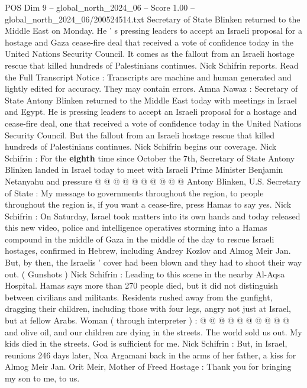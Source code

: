 \begin{textsample}{POS Dim 9 – global\_north\_2024\_06 – Score 1.00 – global\_north\_2024\_06/200524514.txt}  \label{ex:f9_pos_286}
Secretary of State Blinken returned to the Middle East on Monday.
He ' s pressing leaders to accept an Israeli proposal for a hostage and Gaza cease-fire deal that received a vote of confidence today in the United Nations Security Council.
It comes as the fallout from an Israeli hostage rescue that killed hundreds of Palestinians continues.
Nick Schifrin reports.
Read the Full Transcript Notice : Transcripts are machine and human generated and lightly edited for accuracy.
They may contain errors.
Amna Nawaz : Secretary of State Antony Blinken returned to the Middle East today with meetings in Israel and Egypt.
He is pressing leaders to accept an Israeli proposal for a hostage and cease-fire deal, one that received a vote of confidence today in the United Nations Security Council.
But the fallout from an Israeli hostage rescue that killed hundreds of Palestinians continues.
Nick Schifrin begins our coverage.
Nick Schifrin : For the \textbf{eighth} time since October the 7th, Secretary of State Antony Blinken landed in Israel today to meet with Israeli Prime Minister Benjamin Netanyahu and pressure @ @ @ @ @ @ @ @ @ @ Antony Blinken, U.S.
Secretary of State : My message to governments throughout the region, to people throughout the region is, if you want a cease-fire, press Hamas to say yes.
Nick Schifrin : On Saturday, Israel took matters into its own hands and today released this new video, police and intelligence operatives storming into a Hamas compound in the middle of Gaza in the middle of the day to rescue Israeli hostages, confirmed in Hebrew, including Andrey Kozlov and Almog Meir Jan.
But, by then, the Israelis ' cover had been blown and they had to shoot their way out. ( Gunshots ) Nick Schifrin : Leading to this scene in the nearby Al-Aqsa Hospital.
Hamas says more than 270 people died, but it did not distinguish between civilians and militants.
Residents rushed away from the gunfight, dragging their children, including those with four legs, angry not just at Israel, but at fellow Arabs.
Woman ( through interpreter ) : @ @ @ @ @ @ @ @ @ @ and olive oil, and our children are dying in the streets.
The world sold us out.
My kids died in the streets.
God is sufficient for me.
Nick Schifrin : But, in Israel, reunions 246 days later, Noa Argamani back in the arms of her father, a kiss for Almog Meir Jan.
Orit Meir, Mother of Freed Hostage : Thank you for bringing my son to me, to us.

\end{textsample}
